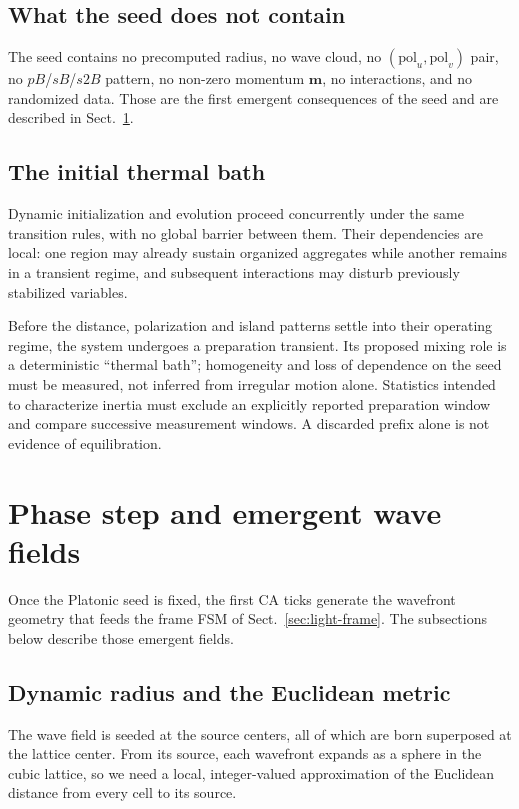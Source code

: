 \documentclass[a4paper]{article}
\begin{document}
\subsection{What the seed does not contain}
The seed contains no precomputed radius, no wave cloud, no $(\mathrm{pol}_u,\mathrm{pol}_v)$ pair, no $pB$/$sB$/$s2B$ pattern, no non-zero momentum $\boldsymbol{m}$, no interactions, and no randomized data.  Those are the first emergent consequences of the seed and are described in Sect.~\ref{sec:phase-step}.
\subsection{The initial thermal bath}
Dynamic initialization and evolution proceed concurrently under the same transition rules, with no global barrier between them. Their dependencies are local: one region may already sustain organized aggregates while another remains in a transient regime, and subsequent interactions may disturb previously stabilized variables.

Before the distance, polarization and island patterns settle into their operating regime, the system undergoes a preparation transient. Its proposed mixing role is a deterministic ``thermal bath''; homogeneity and loss of dependence on the seed must be measured, not inferred from irregular motion alone. Statistics intended to characterize inertia must exclude an explicitly reported preparation window and compare successive measurement windows. A discarded prefix alone is not evidence of equilibration.
\section{Phase step and emergent wave fields}\label{sec:phase-step}
Once the Platonic seed is fixed, the first CA ticks generate the wavefront geometry that feeds the frame FSM of Sect.~\ref{sec:light-frame}.  The subsections below describe those emergent fields.
\subsection{Dynamic radius and the Euclidean metric}\label{subsec:wavefront-metric}
The wave field is seeded at the source centers, all of which are born superposed at the lattice center.  From its source, each wavefront expands as a sphere in the cubic lattice, so we need a local, integer-valued approximation of the Euclidean distance from every cell to its source.
\end{document}
